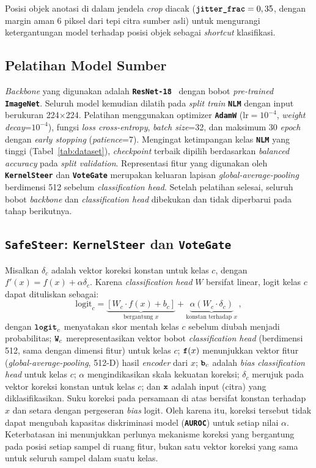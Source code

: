 \documentclass[conference]{IEEEtran}
\newcommand{\nama}[1]{\textbf{\texttt{#1}}}
\begin{document}
Posisi objek anotasi di dalam jendela \textit{crop} diacak ($\text{\nama{jitter\_frac}}=0,35$, dengan margin aman 6 piksel dari tepi citra sumber asli) untuk mengurangi ketergantungan model terhadap posisi objek sebagai \textit{shortcut} klasifikasi.

\subsection{Pelatihan Model Sumber}
\textit{Backbone} yang digunakan adalah \nama{ResNet-18}~\cite{b23} dengan bobot \textit{pre-trained} \nama{ImageNet}. Seluruh model kemudian dilatih pada \textit{split train} \nama{NLM} dengan input berukuran 224$\times$224. Pelatihan menggunakan optimizer \nama{AdamW} ($\text{lr}=10^{-4}$, \textit{weight decay}=$10^{-4}$), fungsi \textit{loss cross-entropy}, \textit{batch size}=32, dan maksimum 30 \textit{epoch} dengan \textit{early stopping} (\textit{patience}=7). Mengingat ketimpangan kelas \nama{NLM} yang tinggi (Tabel~\ref{tab:dataset}), \textit{checkpoint} terbaik dipilih berdasarkan \textit{balanced accuracy} pada \textit{split validation}. Representasi fitur yang digunakan oleh \nama{KernelSteer} dan \nama{VoteGate} merupakan keluaran lapisan \textit{global-average-pooling} berdimensi 512 sebelum \textit{classification head}. Setelah pelatihan selesai, seluruh bobot \textit{backbone} dan \textit{classification head} dibekukan dan tidak diperbarui pada tahap berikutnya.

\subsection{\nama{SafeSteer}: \nama{KernelSteer} dan \nama{VoteGate}}
Misalkan $\delta_c$ adalah vektor koreksi konstan untuk kelas $c$, dengan $f'(x)=f(x)+\alpha\delta_c$. Karena \textit{classification head} $W$ bersifat linear, logit kelas $c$ dapat dituliskan sebagai:
\begin{equation}
\text{logit}_c = \underbrace{[W_c\cdot f(x)+b_c]}_{\text{bergantung } x} + \underbrace{\alpha(W_c\cdot\delta_c)}_{\text{konstan terhadap } x} \, ,
\tag*{}\label{eq:limitation}
\end{equation}
dengan $\text{\nama{logit}}_c$ menyatakan skor mentah kelas $c$ sebelum diubah menjadi probabilitas; $\text{\nama{W}}_c$ merepresentasikan vektor bobot \textit{classification head} (berdimensi 512, sama dengan dimensi fitur) untuk kelas $c$; $\text{\nama{f}}(x)$ menunjukkan vektor fitur (\textit{global-average-pooling}, 512-D) hasil \textit{encoder} dari $x$; $\text{\nama{b}}_c$ adalah \textit{bias classification head} untuk kelas $c$; $\alpha$ mengindikasikan skala kekuatan koreksi; $\delta_c$ merujuk pada vektor koreksi konstan untuk kelas $c$; dan $\text{\nama{x}}$ adalah input (citra) yang diklasifikasikan. Suku koreksi pada persamaan di atas bersifat konstan terhadap $x$ dan setara dengan pergeseran \textit{bias} logit. Oleh karena itu, koreksi tersebut tidak dapat mengubah kapasitas diskriminasi model (\nama{AUROC}) untuk setiap nilai $\alpha$. Keterbatasan ini menunjukkan perlunya mekanisme koreksi yang bergantung pada posisi setiap sampel di ruang fitur, bukan satu vektor koreksi yang sama untuk seluruh sampel dalam suatu kelas.
\end{document}
